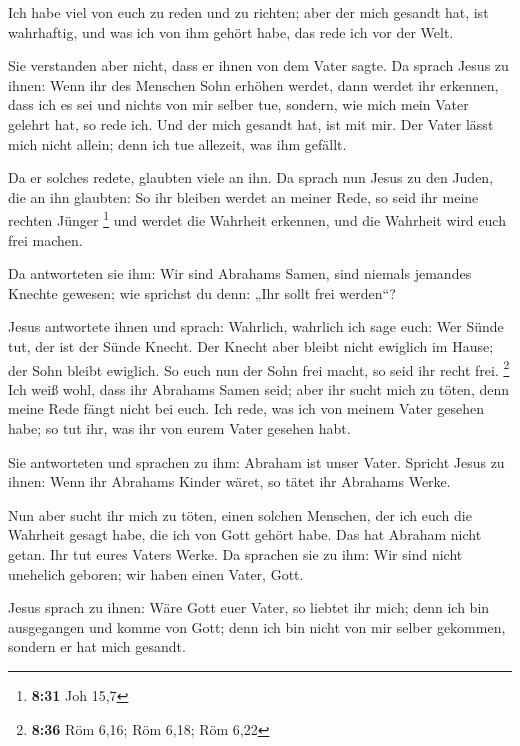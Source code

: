  Ich habe viel von euch zu reden und zu richten; aber der
mich gesandt hat, ist wahrhaftig, und was ich von ihm gehört habe, das
rede ich vor der Welt.

 Sie verstanden aber nicht, dass er ihnen von dem Vater
sagte.  Da sprach Jesus zu ihnen: Wenn ihr des Menschen
Sohn erhöhen werdet, dann werdet ihr erkennen, dass ich es sei und
nichts von mir selber tue, sondern, wie mich mein Vater gelehrt hat, so
rede ich.  Und der mich gesandt hat, ist mit mir. Der Vater
lässt mich nicht allein; denn ich tue allezeit, was ihm gefällt.

 Da er solches redete, glaubten viele an ihn. 
Da sprach nun Jesus zu den Juden, die an ihn glaubten: So ihr bleiben
werdet an meiner Rede, so seid ihr meine rechten Jünger \footnote{\textbf{8:31}
  Joh 15,7}  und werdet die Wahrheit erkennen, und die
Wahrheit wird euch frei machen.

 Da antworteten sie ihm: Wir sind Abrahams Samen, sind
niemals jemandes Knechte gewesen; wie sprichst du denn: „Ihr sollt frei
werden``?

 Jesus antwortete ihnen und sprach: Wahrlich, wahrlich ich
sage euch: Wer Sünde tut, der ist der Sünde Knecht.  Der
Knecht aber bleibt nicht ewiglich im Hause; der Sohn bleibt ewiglich.
 So euch nun der Sohn frei macht, so seid ihr recht frei.
\footnote{\textbf{8:36} Röm 6,16; Röm 6,18; Röm 6,22}  Ich
weiß wohl, dass ihr Abrahams Samen seid; aber ihr sucht mich zu töten,
denn meine Rede fängt nicht bei euch.  Ich rede, was ich
von meinem Vater gesehen habe; so tut ihr, was ihr von eurem Vater
gesehen habt.

 Sie antworteten und sprachen zu ihm: Abraham ist unser
Vater. Spricht Jesus zu ihnen: Wenn ihr Abrahams Kinder wäret, so tätet
ihr Abrahams Werke.

 Nun aber sucht ihr mich zu töten, einen solchen Menschen,
der ich euch die Wahrheit gesagt habe, die ich von Gott gehört habe. Das
hat Abraham nicht getan.  Ihr tut eures Vaters Werke. Da
sprachen sie zu ihm: Wir sind nicht unehelich geboren; wir haben einen
Vater, Gott.

 Jesus sprach zu ihnen: Wäre Gott euer Vater, so liebtet
ihr mich; denn ich bin ausgegangen und komme von Gott; denn ich bin
nicht von mir selber gekommen, sondern er hat mich gesandt.

